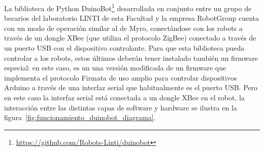 La biblioteca de Python
DuinoBot\footnote{\url{https://github.com/Robots-Linti/duinobot}}
desarrollada en conjunto entre un grupo
de becarios del laboratorio LINTI de esta Facultad y la empresa RobotGroup
cuenta con un modo de operación similar al de Myro, conectándose con
los robots a través de un dongle XBee (que utiliza el protocolo ZigBee)
conectado a través de un puerto USB con el dispositivo controlante.
Para que esta biblioteca pueda controlar a los robots, estos últimos
deberán tener instalado también un firmware especial: en este caso,
es un una versión modificada de un firmware que implementa el protocolo
Firmata de uso amplio para controlar dispositivos Arduino a través de una
interfaz serial que habitualmente es el puerto USB. Pero en este caso
la interfaz serial está conectada a un dongle XBee en el robot, la interacción
entre las distintas capas de software y hardware se ilustra en la
figura~\ref{fig:funcionamiento_duinobot_diagrama}.

